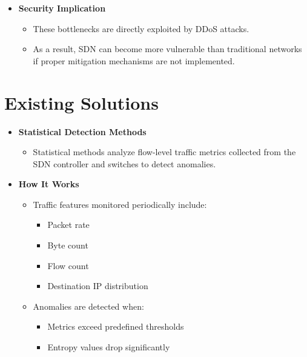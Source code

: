 \documentclass[12pt,a4paper]{article}
\begin{document}
\begin{itemize}
  \begin{itemize}
    \item The Southbound Interface (SBI) channel between the controller and
    switches carries:
    \begin{itemize}
      \item Flow rule installation messages
      \item Statistics polling messages
      \item Packet in messages
    \end{itemize}
    \item High-rate DDoS traffic can saturate this channel, delaying legitimate
    flow rule updates.
  \end{itemize}
  \item \textbf{Security Implication}
  \begin{itemize}
    \item These bottlenecks are directly exploited by DDoS attacks.
    \item As a result, SDN can become more vulnerable than traditional networks
    if proper mitigation mechanisms are not implemented.
  \end{itemize}
\end{itemize}

\newpage
\section{Existing Solutions}
\begin{itemize}
  \item \textbf{Statistical Detection Methods}
  \begin{itemize}
    \item Statistical methods analyze flow-level traffic metrics collected from
    the SDN controller and switches to detect anomalies.
  \end{itemize}
  \item \textbf{How It Works}
  \begin{itemize}
    \item Traffic features monitored periodically include:
    \begin{itemize}
      \item Packet rate
      \item Byte count
      \item Flow count
      \item Destination IP distribution
    \end{itemize}
    \item Anomalies are detected when:
    \begin{itemize}
      \item Metrics exceed predefined thresholds
      \item Entropy values drop significantly
    \end{itemize}
  \end{itemize}
\end{itemize}
\end{document}
